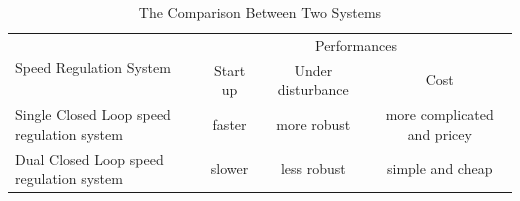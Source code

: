 \documentclass[11pt,english, openany]{book}
\begin{document}
\lipsum[2]


\begin{table}[h]
	\centering
	\small
	\begin{tabular}{lccc}
		\toprule
		\multirow{2}{*}{Speed Regulation System} & \multicolumn{3}{c}{Performances} \\ \cmidrule(lr){2-4}
		& Start up &  Under disturbance &  Cost \\
		\midrule
		Single Closed Loop speed regulation system  & faster & more robust & more complicated and pricey \\
		Dual Closed Loop speed regulation system & slower & less robust & simple and cheap \\
		\bottomrule
	\end{tabular}
	\caption{The Comparison Between Two Systems}
	\label{tab-label-1}
\end{table}

\lipsum[3-5]

\pagebreak




\pagebreak

\end{document}
